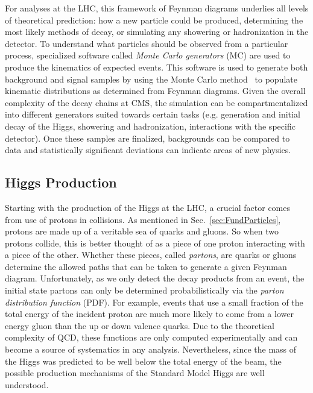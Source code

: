 For analyses at the LHC, this framework of Feynman diagrams underlies all levels of theoretical prediction: how a new particle could be produced, determining the most likely methods of decay, or simulating any showering or hadronization in the detector. To understand what particles should be observed from a particular process, specialized software called \textit{Monte Carlo generators} (MC) are used to produce the kinematics of expected events. This software is used to generate both background and signal samples by using the Monte Carlo method~\cite{} to populate kinematic distributions as determined from Feynman diagrams. Given the overall complexity of the decay chains at CMS, the simulation can be compartmentalized into different generators suited towards certain tasks (e.g. generation and initial decay of the Higgs, showering and hadronization, interactions with the specific detector). Once these samples are finalized, backgrounds can be compared to data and statistically significant deviations can indicate areas of new physics.

\subsection{Higgs Production}
\label{sec:HiggsProduction}

Starting with the production of the Higgs at the LHC, a crucial factor comes from use of protons in collisions. As mentioned in Sec.~\ref{sec:FundParticles}, protons are made up of a veritable sea of quarks and gluons. So when two protons collide, this is better thought of as a piece of one proton interacting with a piece of the other. Whether these pieces, called \textit{partons}, are quarks or gluons determine the allowed paths that can be taken to generate a given Feynman diagram. Unfortunately, as we only detect the decay products from an event, the initial state partons can only be determined probabilistically via the \textit{parton distribution function} (PDF). For example, events that use a small fraction of the total energy of the incident proton are much more likely to come from a lower energy gluon than the up or down valence quarks. Due to the theoretical complexity of QCD, these functions are only computed experimentally and can become a source of systematics in any analysis. Nevertheless, since the mass of the Higgs was predicted to be well below the total energy of the beam, the possible production mechanisms of the Standard Model Higgs are well understood.


